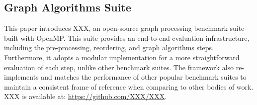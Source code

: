 \documentclass[sigconf, nonacm]{acmart}
\begin{document}
\begin{itemize}[topsep=2pt,itemsep=2pt,wide]
\end{itemize}

\subsection{Graph Algorithms Suite}

This paper introduces XXX, an open-source graph processing benchmark suite built with OpenMP. This suite provides an end-to-end evaluation infrastructure, including the pre-processing, reordering, and graph algorithms steps. Furthermore, it adopts a modular implementation for a more straightforward evaluation of each step, unlike other benchmark suites. The framework also re-implements and matches the performance of other popular benchmark suites \cite{beamer_gap_2017,shun_ligra_2013} to maintain a consistent frame of reference when comparing to other bodies of work. XXX is available at:  \url{https://github.com/XXX/XXX}.
\end{document}
